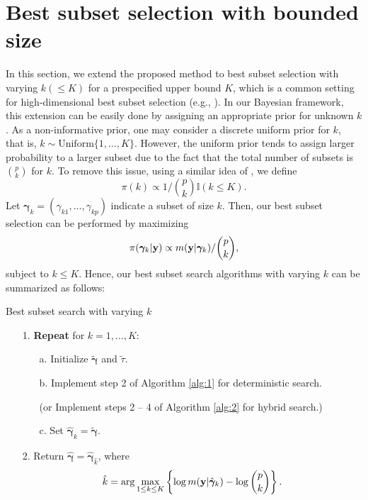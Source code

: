 \documentclass[12pt]{article}
\def\uy{{\bf y}}
\def\bg{{\boldsymbol \gamma}}
\begin{document}
\section{Best subset selection with bounded size}\label{sec:3}
In this section, we extend the proposed method to best subset selection with varying $k (\leq K)$ for a prespecified upper bound $K$, which is a common setting for high-dimensional best subset selection (e.g., \citealt{bertsimas2016best, liang2013bayesian}). In our Bayesian framework, this extension can be easily done by assigning an appropriate prior for unknown $k$. As a non-informative prior, one may consider a discrete uniform prior for $k$, that is, $k \sim \text{Uniform}\{1,\ldots,K\}$. However, the uniform prior tends to assign larger probability to a larger subset due to the fact that the total number of subsets is $\binom{p}{k}$ for $k$. To remove this issue, using  a similar idea of \citet{chen2008extended}, we define 
$$\pi(k)\propto 1/\binom{p}{k} \mathbb{I}(k\leq K).$$
Let $\bg_{k}=(\gamma_{k1},\ldots,\gamma_{kp})$ indicate a subset of size $k$. Then, our best subset selection can be performed by maximizing  
\begin{eqnarray*}
\pi(\bg_k|\uy)\propto  m(\uy|\bg_k)/\binom{p}{k},
\end{eqnarray*}
subject to $k\leq K$. Hence, our best subset search algorithms with varying $k$ can be summarized as follows:
\begin{algorithm}[ht]
\caption{Best subset search with varying $k$}\label{alg:3}
\begin{itemize}
\item[1.] \textbf{Repeat} for $k=1,\ldots,K$:
\begin{itemize}
\item[a.] Initialize $\tilde{\bg}$ and $\tilde{\tau}$.
\item[b.] Implement step 2 of Algorithm \ref{alg:1} for deterministic search.
\item[] (or Implement steps 2 -- 4 of Algorithm \ref{alg:2} for hybrid search.)
\item[c.] Set $\hat{\bg}_k=\tilde{\bg}$.
\end{itemize}
\item[2.] Return $\hat{\bg}=\hat{\bg}_{\hat{k}}$, where \begin{eqnarray}\label{eq:post}  \hat{k}=\arg\max_{1\leq k\leq K} \left\{\log m(\uy|\hat{\bg}_k)-\log \binom{p}{k}\right\}.
\end{eqnarray}
\end{itemize}
\end{algorithm}
\end{document}
